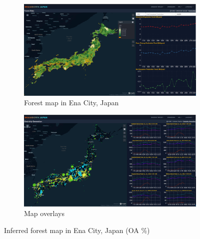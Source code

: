 \begin{figure}[p]
  \begin{subfigure}{.5\textwidth}
    \centering
    \includegraphics[width=.9\textwidth]{figs/chap7/ems_forest.png}
      \caption{Forest map in Ena City, Japan}
  \end{subfigure}%
  \begin{subfigure}{.5\textwidth}
      \centering
      \includegraphics[width=.9\textwidth]{figs/chap7/ems_electric.png}
      \caption{Map overlays}
  \end{subfigure}
  \caption[Inferred forest map in Ena City]{Inferred forest map in Ena City, Japan  (OA \%)}
  \label{fig:chap7_fig2}
\end{figure}


